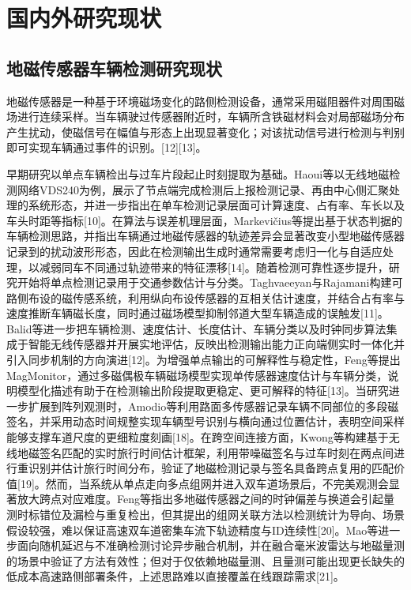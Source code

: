 \documentclass{xdupgthesis}
\begin{document}
\section{国内外研究现状}



\subsection{地磁传感器车辆检测研究现状}
地磁传感器是一种基于环境磁场变化的路侧检测设备，通常采用磁阻器件对周围磁场进行连续采样。当车辆驶过传感器附近时，车辆所含铁磁材料会对局部磁场分布产生扰动，使磁信号在幅值与形态上出现显著变化；对该扰动信号进行检测与判别即可实现车辆通过事件的识别。[12][13]。

早期研究以单点车辆检出与过车片段起止时刻提取为基础。Haoui等以无线地磁检测网络VDS240为例，展示了节点端完成检测后上报检测记录、再由中心侧汇聚处理的系统形态，并进一步指出在单车检测记录层面可计算速度、占有率、车长以及车头时距等指标[10]。在算法与误差机理层面，Markevičius等提出基于状态判据的车辆检测思路，并指出车辆通过地磁传感器的轨迹差异会显著改变小型地磁传感器记录到的扰动波形形态，因此在检测输出生成时通常需要考虑归一化与自适应处理，以减弱同车不同通过轨迹带来的特征漂移[14]。随着检测可靠性逐步提升，研究开始将单点检测记录用于交通参数估计与分类。Taghvaeeyan与Rajamani构建可路侧布设的磁传感系统，利用纵向布设传感器的互相关估计速度，并结合占有率与速度推断车辆磁长度，同时通过磁场模型抑制邻道大型车辆造成的误触发[11]。Balid等进一步把车辆检测、速度估计、长度估计、车辆分类以及时钟同步算法集成于智能无线传感器并开展实地评估，反映出检测输出能力正向端侧实时一体化并引入同步机制的方向演进[12]。为增强单点输出的可解释性与稳定性，Feng等提出MagMonitor，通过多磁偶极车辆磁场模型实现单传感器速度估计与车辆分类，说明模型化描述有助于在检测输出阶段提取更稳定、更可解释的特征[13]。当研究进一步扩展到阵列观测时，Amodio等利用路面多传感器记录车辆不同部位的多段磁签名，并采用动态时间规整实现车辆型号识别与横向通过位置估计，表明空间采样能够支撑车道尺度的更细粒度刻画[18]。在跨空间连接方面，Kwong等构建基于无线地磁签名匹配的实时旅行时间估计框架，利用带噪磁签名与过车时刻在两点间进行重识别并估计旅行时间分布，验证了地磁检测记录与签名具备跨点复用的匹配价值[19]。然而，当系统从单点走向多点组网并进入双车道场景后，不完美观测会显著放大跨点对应难度。Feng等指出多地磁传感器之间的时钟偏差与换道会引起量测时标错位及漏检与重复检出，但其提出的组网关联方法以检测统计为导向、场景假设较强，难以保证高速双车道密集车流下轨迹精度与ID连续性[20]。Mao等进一步面向随机延迟与不准确检测讨论异步融合机制，并在融合毫米波雷达与地磁量测的场景中验证了方法有效性；但对于仅依赖地磁量测、且量测可能出现更长缺失的低成本高速路侧部署条件，上述思路难以直接覆盖在线跟踪需求[21]。
\end{document}
